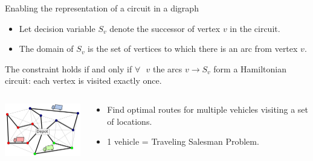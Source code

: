 \documentclass{cons-beamer}
\begin{document}
\begin{frame}{Enabling the representation of a circuit in a digraph}
  \begin{itemize}
    \item Let decision variable $S_v$ denote the successor of vertex $v$ in the circuit.
    \item The domain of $S_v$ is the set of vertices to which there is an arc from vertex $v$.
  \end{itemize}
  \begin{definition}
      The  constraint holds if and only if $\forall \text{ } v$ the arcs $v \rightarrow S_v$ form a Hamiltonian circuit: each vertex is visited exactly once.
  \end{definition}
  
  \begin{example}
    \begin{columns}
      \begin{column}{0.4\textwidth}
        \centering
        \includegraphics[width=40mm]{images/VRP.png}
      \end{column}
      \begin{column}{0.6\textwidth}
        \begin{itemize}
          \item Find optimal routes for multiple vehicles visiting a set of locations.
          \item 1 vehicle = Traveling Salesman Problem.
        \end{itemize}
      \end{column}
    \end{columns}
  \end{example}
\end{frame}
\end{document}
